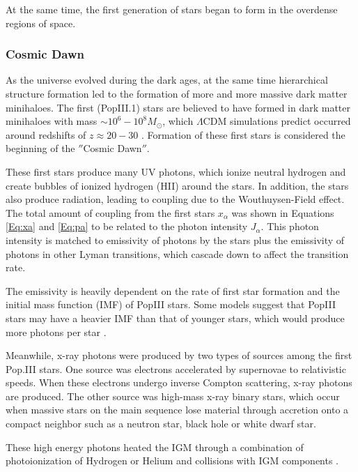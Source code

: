 At the same time, the first generation of stars began to form in the overdense regions of space. 

\subsubsection{Cosmic Dawn}
As the universe evolved during the dark ages, at the same time hierarchical structure formation led to the formation of more and more massive dark matter minihaloes. The first (PopIII.1) stars are believed to have formed in dark matter minihaloes with mass $\sim 10^6 - 10^8 M_{\odot}$, which $\Lambda$CDM simulations predict occurred around redshifts of $z \approx 20-30$ \cite{bromm_2013}. Formation of these first stars is considered the beginning of the $''$Cosmic Dawn$''$. 


These first stars produce many UV photons, which ionize neutral hydrogen and create bubbles of ionized hydrogen (HII) around the stars. In addition, the stars also produce \lya  radiation, leading to coupling due to the Wouthuysen-Field effect. The total amount of coupling from the first stars $x_\alpha$ was shown in Equations \ref{Eq:xa} and \ref{Eq:pa} to be related to the \lya  photon intensity $J_\alpha$. This photon intensity is matched to emissivity of \lya  photons by the stars  plus the emissivity of photons in other Lyman transitions, which cascade down to affect the \lya  transition rate. 

The emissivity is heavily dependent on the rate of first star formation and the initial mass function (IMF) of PopIII stars. Some models suggest that PopIII stars may have a heavier IMF than that of younger stars, which would produce more \lya  photons per star \cite{natarajan_2014}. 

Meanwhile, x-ray photons were produced by two types of sources among the first Pop.III stars. One source was electrons accelerated by supernovae to relativistic speeds. When these electrons undergo inverse Compton scattering, x-ray photons are produced. The other source was high-mass x-ray binary stars, which occur when massive stars on the main sequence lose material through accretion onto a compact neighbor such as a neutron star, black hole or white dwarf star. 

These high energy photons heated the IGM through a combination of photoionization of Hydrogen or Helium and collisions with IGM components \cite{furlanetto_2006}. 

